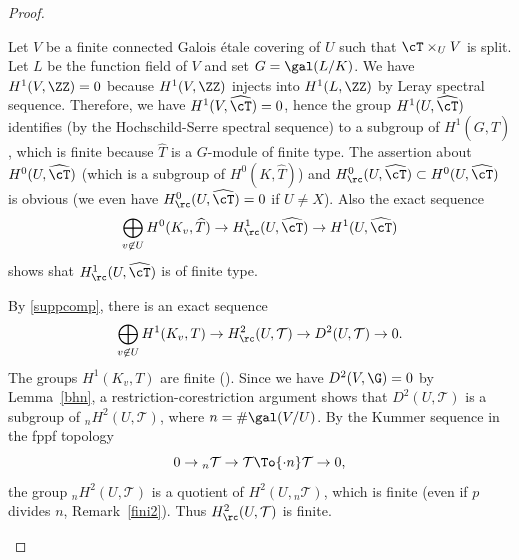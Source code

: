 \skpt
\begin{proof}
\begin{enumeratea}
\item
Let $V$ be a finite connected Galois étale covering of $U$ such that
$\cT \times_U V$ is split. Let $L$ be the function field
of $V$ and set $G=\gal(L/K)$. We have
$H^1(V,\ZZ)=0$ because $H^1(V,\ZZ)$ injects into $H^1(L, \ZZ)$
by Leray spectral sequence.
Therefore, we have $H^1(V,\widehat\cT)=0$,
hence the group $H^1(U,\widehat \cT)$ identifies
(by the Hochschild-Serre spectral sequence) to a subgroup of
$H^1(G,\widehat T)$, which is finite because $\widehat T$ is a
$G$-module of finite type. The assertion about $H^0(U,\widehat\cT)$
(which is a subgroup of $H^0(K,\widehat T)$) and $H^0_\rc(U,\widehat\cT)
\subset H^0(U,\widehat\cT)$ is obvious (we even have
$H^0_\rc(U,\widehat\cT)=0$ if $U \neq X$). Also the exact sequence\vspace*{-3pt}
\[
\bigoplus_{v \not \in U} H^0(K_v,\widehat T) \to H^1_\rc(U,\widehat \cT) \to
H^1(U,\widehat \cT)
\] shows shat $H^1_\rc(U,\widehat \cT)$ is of finite type.

\item
By \eqref{suppcomp}, there is an exact sequence\vspace*{-3pt}
\[
\bigoplus_{v \not \in U} H^1(K_v,T) \to H^2_\rc(U, \mathcal T)
\to D^2(U,\mathcal T) \to 0.
\]
The groups $H^1(K_v,T)$ are finite (\cite[Cor.\,I.2.3]{MilADT}).
Since we have $D^2(V,\G)=0$ by Lemma~\ref{bhn},
a restriction-corestriction argument
shows that $D^2(U,\mathcal T)$ is a subgroup of $_n H^2(U,\mathcal T)$,
where $n=\# \gal(V/U)$.
By the Kummer sequence in the fppf topology\vspace*{-3pt}
\[
0 \to {}_n \mathcal T \to \mathcal T \To{\cdot n} \mathcal T \to 0,
\]
the group $_n H^2(U,\mathcal T)$ is a quotient of
$H^2(U,{}_n \mathcal T)$, which is finite (even if $p$ divides $n$,
\cf Remark~\ref{fini2}). Thus $H^2_\rc(U,\mathcal T)$ is finite.


\end{enumeratea}
\end{proof}
